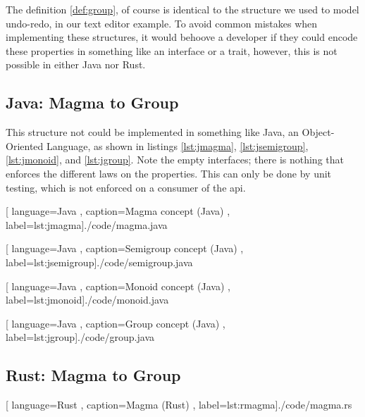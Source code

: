 The definition \ref{def:group}, of course is identical to the structure we used
to model undo-redo, in our text editor example. To avoid common mistakes when
implementing these structures, it would behoove a developer if they could encode
these properties in something like an interface or a trait, however, this is not
possible in either Java nor Rust.


\subsection{Java: Magma to Group}

This structure not could be implemented in something like Java, an
Object-Oriented Language, as shown in listings \ref{lst:jmagma},
\ref{lst:jsemigroup}, \ref{lst:jmonoid}, and \ref{lst:jgroup}. Note the empty
interfaces; there is nothing that enforces the different laws on the properties.
This can only be done by unit testing, which is not enforced on a consumer of
the \gls{api}.

\begin{center}
  
    [ language=Java
    , caption={Magma concept (Java)}
    , label=lst:jmagma]{./code/magma.java}
\end{center}

\begin{center}
  
    [ language=Java
    , caption={Semigroup concept (Java)}
    , label=lst:jsemigroup]{./code/semigroup.java}
\end{center}

\begin{center}
  
    [ language=Java
    , caption={Monoid concept (Java)}
    , label=lst:jmonoid]{./code/monoid.java}
\end{center}

\begin{center}
  
    [ language=Java
    , caption={Group concept (Java)}
    , label=lst:jgroup]{./code/group.java}
\end{center}

\subsection{Rust: Magma to Group}


\begin{center}
  
    [ language=Rust
    , caption={Magma (Rust)}
    , label=lst:rmagma]{./code/magma.rs}
\end{center}

